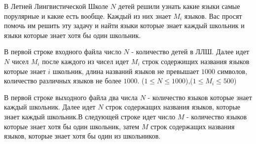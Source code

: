 ﻿В Летней Лингвистической Школе $N$ детей решили узнать какие языки самые порулярные и какие есть вообще. Каждый из них знает $M_i$ языков. 
Вас просят помочь им решить эту задачу и найти языки которые знает каждый школьник и языки которые знает хотя бы один школьник.


\InputFile
В первой строке входного файла число $N$ - количество детей в ЛЛШ.
Далее идет $N$ чисел $M_i$ после каждого из чисел идет $M_i$ строк содержищих названия языков которые знает $i$ школьник, длина названий языков не превышает $1000$ символов, количество различных языков не более $1000$.
($1 \le N \le 1000$),($1 \le M_i \le 500$)

\OutputFile
В первой строке выходного файла два числа $N$ - количество языков которые знает каждый школьник.
Далее идет $N$ строк содержащих названия языков, которые знает каждый школьник.В следующей строке идет число $M$ - количество языков которые знает хотя бы один школьник, затем $M$ строк содержащих названия языков, которые знает хотя бы один из школьников.



